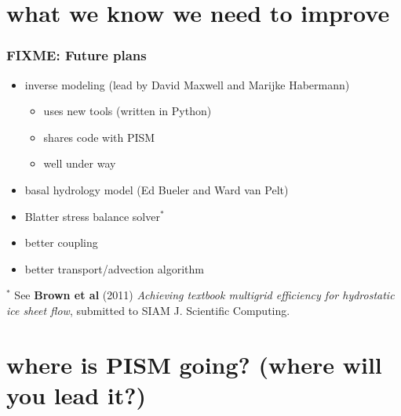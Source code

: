 \documentclass[hide notes,intlimits]{beamer}
\begin{document}
\section[to improve]{what we know we need to improve}


\begin{frame}
  \frametitle{FIXME: Future plans}
  \begin{itemize}
  \item inverse modeling (lead by David Maxwell and Marijke Habermann)
    \begin{itemize}
    \item uses new tools (written in Python)
    \item shares code with PISM
    \item well under way
    \end{itemize}
  \item basal hydrology model (Ed Bueler and Ward van Pelt)
  \item Blatter stress balance solver$^{*}$
  \item better coupling
  \item better transport/advection algorithm
  \end{itemize}

 \begin{flushleft}
   \tiny
    $^{*}$ See \textbf{Brown et al} (2011)
    \emph{Achieving textbook multigrid efficiency for hydrostatic ice sheet
      flow}, submitted to SIAM J. Scientific Computing.
  \end{flushleft}
\end{frame}


\section[where to?]{where is PISM going?  (where will you lead it?)}
\end{document}

